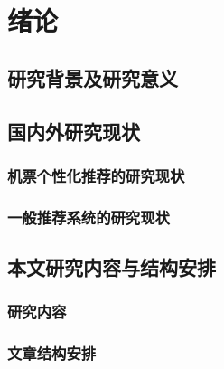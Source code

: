 
\chapter{绪论 }
\label{chap:intro}


\section{研究背景及研究意义}

\section{国内外研究现状}
\subsection{机票个性化推荐的研究现状}
\subsection{一般推荐系统的研究现状}


\section{本文研究内容与结构安排}
\subsection{研究内容}
\subsection{文章结构安排}